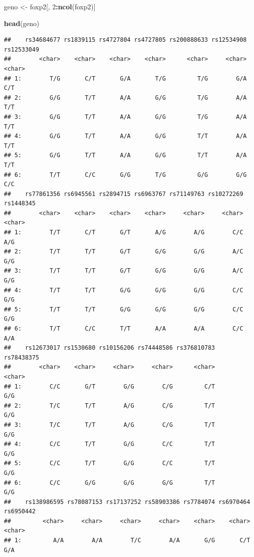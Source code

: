 \documentclass[
]{article}
\newenvironment{Shaded}{\begin{snugshade}}{\end{snugshade}}
\newcommand{\DecValTok}[1]{\textcolor[rgb]{0.00,0.00,0.81}{#1}}
\newcommand{\FunctionTok}[1]{\textcolor[rgb]{0.13,0.29,0.53}{\textbf{#1}}}
\newcommand{\NormalTok}[1]{#1}
\newcommand{\OtherTok}[1]{\textcolor[rgb]{0.56,0.35,0.01}{#1}}
\newcommand{\SpecialCharTok}[1]{\textcolor[rgb]{0.81,0.36,0.00}{\textbf{#1}}}
\begin{document}
\begin{Shaded}
\begin{Highlighting}[]
\NormalTok{geno }\OtherTok{\textless{}{-}}\NormalTok{ foxp2[, }\DecValTok{2}\SpecialCharTok{:}\FunctionTok{ncol}\NormalTok{(foxp2)]}

\FunctionTok{head}\NormalTok{(geno)}
\end{Highlighting}
\end{Shaded}

\begin{verbatim}
##    rs34684677 rs1839115 rs4727804 rs4727805 rs200888633 rs12534908 rs12533049
##        <char>    <char>    <char>    <char>      <char>     <char>     <char>
## 1:        T/G       C/T       G/A       T/G         T/G        G/A        C/T
## 2:        G/G       T/T       A/A       G/G         T/G        A/A        T/T
## 3:        G/G       T/T       A/A       G/G         T/G        A/A        T/T
## 4:        G/G       T/T       A/A       G/G         T/T        A/A        T/T
## 5:        G/G       T/T       A/A       G/G         T/T        A/A        T/T
## 6:        T/T       C/C       G/G       T/G         G/G        G/G        C/C
##    rs77861356 rs6945561 rs2894715 rs6963767 rs71149763 rs10272269 rs1448345
##        <char>    <char>    <char>    <char>     <char>     <char>    <char>
## 1:        T/T       C/T       G/T       A/G        A/G        C/C       A/G
## 2:        T/T       T/T       G/T       G/G        G/G        A/C       G/G
## 3:        T/T       T/T       G/T       G/G        G/G        A/C       G/G
## 4:        T/T       T/T       G/G       G/G        G/G        C/C       G/G
## 5:        T/T       T/T       G/G       G/G        G/G        C/C       G/G
## 6:        T/T       C/C       T/T       A/A        A/A        C/C       A/A
##    rs12673017 rs1530680 rs10156206 rs74448586 rs376810783 rs78438375
##        <char>    <char>     <char>     <char>      <char>     <char>
## 1:        C/C       G/T        G/G        C/G         C/T        G/G
## 2:        T/C       T/T        A/G        C/G         T/T        G/G
## 3:        T/C       T/T        A/G        C/G         T/T        G/G
## 4:        C/C       T/T        G/G        C/C         T/T        G/G
## 5:        C/C       T/T        G/G        C/C         T/T        G/G
## 6:        C/C       G/G        G/G        G/G         T/T        G/G
##    rs138986595 rs78087153 rs17137252 rs58903386 rs7784074 rs6970464 rs6950442
##         <char>     <char>     <char>     <char>    <char>    <char>    <char>
## 1:         A/A        A/A        T/C        A/A       G/G       C/T       G/A

\end{verbatim}
\end{document}
